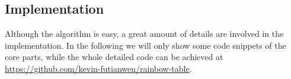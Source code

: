 \documentclass{article}
\begin{document}
\begin{multicols}{2}
\section{Implementation}
Although the algorithm is easy, a great amount of details are involved in the implementation. In the following we will only show some code snippets of the core parts, while the whole detailed code can be achieved at \url{https://github.com/kevin-futianwen/rainbow-table}. 



\end{multicols}
\end{document}
